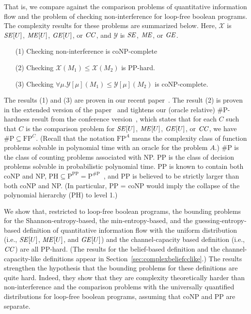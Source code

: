 \documentclass{llncs}
\begin{document}
That is, we compare against the comparison problems of quantitative
information flow and the problem of checking non-interference for
loop-free boolean programs.  The complexity results for these problems
are summarized below.  Here, $\mathcal{X}$ is ${\it SE}[U]$, ${\it
  ME}[U]$, ${\it GE}[U]$, or ${\it CC}$, and $\mathcal{Y}$ is ${\it
  SE}$, ${\it ME}$, or ${\it GE}$.
\begin{itemize}
\item[(1)] Checking non-interference is coNP-complete
\item[(2)] Checking $\mathcal{X}(M_1) \leq \mathcal{X}(M_2)$ is PP-hard.
\item[(3)] Checking $\forall \mu.\mathcal{Y}[\mu](M_1) \leq \mathcal{Y}[\mu](M_2)$ is coNP-complete.
\end{itemize}
The results (1) and (3) are proven in our recent
paper~\cite{DBLP:conf/csfw/yasuoka2010}.  The result (2) is proven in
the extended version of the paper~\cite{yasuoka:toplas2010submit} and
tightens our (oracle relative) \#P-hardness result from the conference
version~\cite{DBLP:conf/csfw/yasuoka2010}, which states that for each
$C$ such that $C$ is the comparison problem for ${\it SE}[U]$, ${\it
  ME}[U]$, ${\it GE}[U]$, or ${\it CC}$, we have $\text{\#P} \subseteq
\text{FP}^C$.  (Recall that the notation $\text{FP}^A$ means the
complexity class of function problems solvable in polynomial time with
an oracle for the problem $A$.)  \#P is the class of counting problems
associated with NP.  PP is the class of decision problems solvable in
probabilistic polynomial time.  PP is known to contain both coNP and
NP, $\text{PH} \subseteq \text{P}^\text{PP} =
\text{P}^\text{\#P}$~\cite{toda91}, and PP is believed to be strictly
larger than both coNP and NP.  (In particular, PP = coNP would imply
the collapse of the polynomial hierarchy (PH) to level 1.)


We show that, restricted to loop-free boolean programs, the bounding
problems for the Shannon-entropy-based, the min-entropy-based, and the
guessing-entropy-based definition of quantitative information flow with
the uniform distribution (i.e., ${\it SE}[U]$, ${\it ME}[U]$, and
${\it GE}[U]$) and the channel-capacity based definition (i.e., ${\it
  CC}$) are all PP-hard.  (The results for the belief-based definition
and the channel-capacity-like definitions appear in
Section~\ref{sec:complexbeliefcclike}.) The results strengthen the
hypothesis that the bounding problems for these definitions are quite
hard.  Indeed, they show that they are complexity theoretically harder
than non-interference and the comparison problems with the universally
quantified distributions for loop-free boolean programs, assuming that
coNP and PP are separate.
\end{document}
